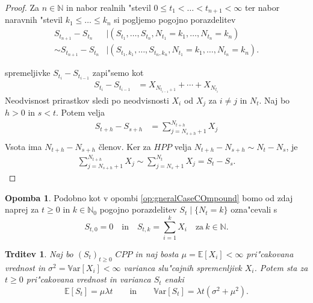 \documentclass[12pt, a4paper, reqno]{amsart}
\theoremstyle{definition}
\newtheorem{opomba}[definicija]{Opomba}
\theoremstyle{plain}
\newtheorem{trditev}[definicija]{Trditev}
\newcommand{\N}{\mathbb{N}}
\newcommand{\E}{\mathbb{E}}
\newcommand{\1}{\mathds{1}}
\newcommand{\Var}[1]{\text{$\mathbb{V}\!\mathrm{ar}$}\left[#1\right]}
\begin{document}
        \begin{proof}
            Za $n\in\N$ in nabor realnih "stevil $0 \leq t_1 < \ldots < t_{n+1}  < \infty$ ter nabor naravnih 
            "stevil $k_1 \leq \ldots \leq k_{n}$ si pogljemo pogojno porazdelitev
            \begin{align*}
                S_{t_{n+1}} - S_{t_n} &\mid (S_{t_1}, \dots, S_{t_n}, N_{t_1} = k_1, \dots, N_{t_n} = k_n) \\
                        \sim S_{t_{n+1}} - S_{t_n} &\mid (S_{t_1, k_1}, \dots, S_{t_n, k_n}, N_{t_1} = k_1, \dots, N_{t_n} = k_n). 
            \end{align*}

            
            spremeljivke $S_{t_i} - S_{t_{i-1}}$ zapi"semo kot
            \begin{align*}
                S_{t_i} - S_{t_{i-1}} &= X_{N_{t_{i - 1} + 1}} + \cdots + X_{N_{t_i}} 
            \end{align*}
            Neodvisnost prirastkov sledi po neodvisnosti $X_i$ od $X_j$ za $i\neq j$ in $N_t$. 
            Naj bo $h > 0$ in $s < t$. Potem velja
            \begin{align*}
                S_{t+h} - S_{s+h} &= \sum_{j=N_{s+h}+1}^{N_{t+h}} X_j \\
            \end{align*}
            Vsota ima $N_{t+h} - N_{s+h}$ členov. Ker za $HPP$ velja 
            $N_{t+h} - N_{s+h} \sim N_t - N_s$, je 
            \begin{align*}
                \sum_{j=N_{s+h}+1}^{N_{t+h}} X_j \sim \sum_{j=N_{s}+1}^{N_{t}} X_j = S_t - S_s.
            \end{align*}
        \end{proof}

        \begin{opomba}
            Podobno kot v opombi \ref{op:gneralCaseCOmpound} bomo od zdaj naprej za $t\geq0$ in  $k\in\N_0$  
            pogojno porazdelitev $S_t \mid \{N_t = k\}$ ozna"cevali s
            \begin{equation*}
                S_{t, 0} = 0 \quad \text{in} \quad S_{t, k} = \sum_{i=1}^kX_i \quad \text{za} \ k\in\N.
            \end{equation*}
        \end{opomba}

        \begin{trditev}
            Naj bo $(S_t)_{t\geq 0}$ $CPP$ in naj bosta $\mu = \E\left[X_i\right] < \infty$ 
            pri"cakovana vrednost in $\sigma^2= \Var{X_i} <\infty$ varianca
            slu"cajnih spremenljivk $X_i$. Potem sta za $t\geq0$ pri"cakovana vrednost in 
            varianca $S_t$ enaki 
            \begin{equation*}
                \E\left[S_t\right] = \mu\lambda t \qquad \text{in} \qquad \Var{S_t} = \lambda t\left(\sigma^2 + \mu^2\right).
            \end{equation*}
            \label{trd:PricVarCPP}
        \end{trditev}
\end{document}
